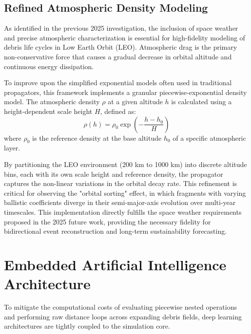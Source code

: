 \documentclass[letterpaper, preprint, 11pt]{AAS}
\begin{document}
\subsection{Refined Atmospheric Density Modeling}
As identified in the previous 2025 investigation, the inclusion of space weather and precise atmospheric characterization is essential for high-fidelity modeling of debris life cycles in Low Earth Orbit (LEO). Atmospheric drag is the primary non-conservative force that causes a gradual decrease in orbital altitude and continuous energy dissipation. 

To improve upon the simplified exponential models often used in traditional propagators, this framework implements a granular piecewise-exponential density model. The atmospheric density $\rho$ at a given altitude $h$ is calculated using a height-dependent scale height $H$, defined as:
\begin{equation}
    \rho(h) = \rho_{0} \exp\left( -\frac{h - h_{0}}{H} \right)
\end{equation}
where $\rho_0$ is the reference density at the base altitude $h_0$ of a specific atmospheric layer. 

By partitioning the LEO environment (200 km to 1000 km) into discrete altitude bins, each with its own scale height and reference density, the propagator captures the non-linear variations in the orbital decay rate. This refinement is critical for observing the "orbital sorting" effect, in which fragments with varying ballistic coefficients diverge in their semi-major-axis evolution over multi-year timescales. This implementation directly fulfills the space weather requirements proposed in the 2025 future work, providing the necessary fidelity for bidirectional event reconstruction and long-term sustainability forecasting.

\section{Embedded Artificial Intelligence Architecture}
\label{sec:ai_architecture}

To mitigate the computational costs of evaluating piecewise nested operations and performing raw distance loops across expanding debris fields, deep learning architectures are tightly coupled to the simulation core.
\end{document}
